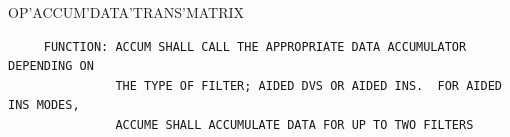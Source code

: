\begin{frame}
OP'ACCUM'DATA'TRANS'MATRIX
\begin{verbatim}
     FUNCTION: ACCUM SHALL CALL THE APPROPRIATE DATA ACCUMULATOR DEPENDING ON
               THE TYPE OF FILTER; AIDED DVS OR AIDED INS.  FOR AIDED INS MODES,
               ACCUME SHALL ACCUMULATE DATA FOR UP TO TWO FILTERS


\end{verbatim}
\end{frame}
